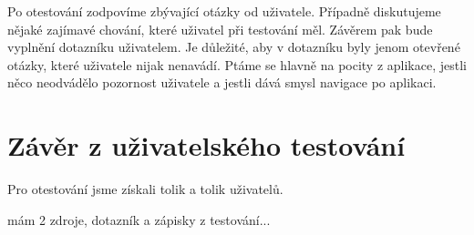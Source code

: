 Po otestování zodpovíme zbývající otázky od uživatele. Případně diskutujeme nějaké zajímavé chování, které uživatel při testování měl. Závěrem pak bude vyplnění dotazníku uživatelem. Je důležité, aby v dotazníku byly jenom otevřené otázky, které uživatele nijak nenavádí. Ptáme se hlavně na pocity z aplikace, jestli něco neodvádělo pozornost uživatele a jestli dává smysl navigace po aplikaci.

\section{Závěr z uživatelského testování}


Pro otestování jsme získali tolik a tolik uživatelů.

mám 2 zdroje, dotazník a zápisky z testování...
